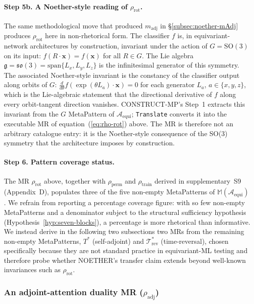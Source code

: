 \documentclass[acmsmall,screen,review]{acmart}
\begin{document}
\paragraph{Step 5b. A Noether-style reading of $\rho_{\mathrm{rot}}$.}
The same methodological move that produced $m_{\mathrm{adj}}$ in \S\ref{subsec:noether-mAdj} produces $\rho_{\mathrm{rot}}$ here in non-rhetorical form. The classifier $f$ is, in equivariant-network architectures by construction, invariant under the action of $G = \mathrm{SO}(3)$ on its input: $f(R \cdot \mathbf{x}) = f(\mathbf{x})$ for all $R \in G$. The Lie algebra $\mathfrak{g} = \mathfrak{so}(3) = \mathrm{span}\{L_x, L_y, L_z\}$ is the infinitesimal generator of this symmetry. The associated Noether-style invariant is the constancy of the classifier output along orbits of $G$: $\frac{d}{d\theta} f(\exp(\theta L_a) \cdot \mathbf{x}) = 0$ for each generator $L_a$, $a \in \{x,y,z\}$, which is the Lie-algebraic statement that the directional derivative of $f$ along every orbit-tangent direction vanishes. CONSTRUCT-MP's Step~1 extracts this invariant from the $G$ MetaPattern of $\mathcal{A}_{\mathrm{equi}}$; \texttt{Translate} converts it into the executable MR of equation~(\ref{eq:rho-rot}) above. The MR is therefore not an arbitrary catalogue entry: it is the Noether-style consequence of the SO(3) symmetry that the architecture imposes by construction.

\paragraph{Step 6. Pattern coverage status.} The MR $\rho_{\mathrm{rot}}$ above, together with $\rho_{\mathrm{perm}}$ and $\rho_{\mathrm{train}}$ derived in supplementary~S9 (Appendix~D), populates three of the five non-empty MetaPatterns of $\mathbb{M}(\mathcal{A}_{\mathrm{equi}})$. We refrain from reporting a percentage coverage figure: with so few non-empty MetaPatterns and a denominator subject to the structural sufficiency hypothesis (Hypothesis~\ref{hyp:seven-blocks}), a percentage is more rhetorical than informative. We instead derive in the following two subsections two MRs from the remaining non-empty MetaPatterns, $T^{*}$ (self-adjoint) and $\mathcal{T}^{*}_{\mathrm{rev}}$ (time-reversal), chosen specifically because they are not standard practice in equivariant-ML testing and therefore probe whether NOETHER's transfer claim extends beyond well-known invariances such as $\rho_{\mathrm{rot}}$.

\subsubsection{An adjoint-attention duality MR (\texorpdfstring{$\rho_{\mathrm{adj}}$}{rho\_adj})}
\label{subsec:rho-adj}
\end{document}
